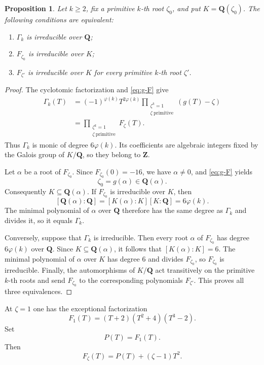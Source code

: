 \documentclass[11pt]{article}
\newtheorem{proposition}[theorem]{Proposition}
\newcommand{\Q}{\mathbf Q}
\newcommand{\Z}{\mathbf Z}
\begin{document}
\begin{proposition}\label{prop:equivalence}
Let $k\geq2$, fix a primitive $k$-th root $\zeta_0$, and put
$K=\Q(\zeta_0)$.  The following conditions are equivalent:
\begin{enumerate}[label=\textup{(\Alph*)}]
 \item $\Gamma_k$ is irreducible over $\Q$;
 \item $F_{\zeta_0}$ is irreducible over $K$;
 \item $F_{\zeta'}$ is irreducible over $K$ for every primitive
       $k$-th root $\zeta'$.
\end{enumerate}
\end{proposition}

\begin{proof}
The cyclotomic factorization and \eqref{eq:g-F} give
\begin{align*}
 \Gamma_k(T)
 &=(-1)^{\varphi(k)}T^{2\varphi(k)}
   \prod_{\substack{\zeta^k=1\\\zeta\ \mathrm{primitive}}}
   (g(T)-\zeta)  \\
 &=\prod_{\substack{\zeta^k=1\\\zeta\ \mathrm{primitive}}}
   F_\zeta(T).
\end{align*}
Thus $\Gamma_k$ is monic of degree $6\varphi(k)$.  Its coefficients are
algebraic integers fixed by the Galois group of $K/\Q$, so they
belong to $\Z$.

Let $\alpha$ be a root of $F_{\zeta_0}$.  Since
$F_{\zeta_0}(0)=-16$, we have
$\alpha\neq0$, and \eqref{eq:g-F} yields
\[
 \zeta_0=g(\alpha)\in\Q(\alpha).
\]
Consequently $K\subseteq\Q(\alpha)$.  If $F_{\zeta_0}$ is irreducible over
$K$, then
\[
 [\Q(\alpha):\Q]=[K(\alpha):K][K:\Q]=6\varphi(k).
\]
The minimal polynomial of $\alpha$ over $\Q$ therefore has the same
degree as $\Gamma_k$ and divides it, so it equals $\Gamma_k$.

Conversely, suppose that $\Gamma_k$ is irreducible.  Then every root
$\alpha$ of $F_{\zeta_0}$ has degree $6\varphi(k)$ over $\Q$.  Since
$K\subseteq\Q(\alpha)$, it follows that $[K(\alpha):K]=6$.  The minimal
polynomial of $\alpha$ over $K$ has degree $6$ and divides
$F_{\zeta_0}$, so $F_{\zeta_0}$ is irreducible.  Finally, the
automorphisms of $K/\Q$ act transitively on the primitive $k$-th roots
and send $F_{\zeta_0}$ to the corresponding polynomials $F_{\zeta'}$.
This proves all three equivalences.
\end{proof}

At $\zeta=1$ one has the exceptional factorization
\begin{equation}\label{eq:P-factor}
 F_1(T)=(T+2)(T^2+4)(T^3-2).
\end{equation}
Set
\[
 P(T)=F_1(T).
\]
Then
\begin{equation}\label{eq:perturbation}
 F_\zeta(T)=P(T)+(\zeta-1)T^2.
\end{equation}
\end{document}
